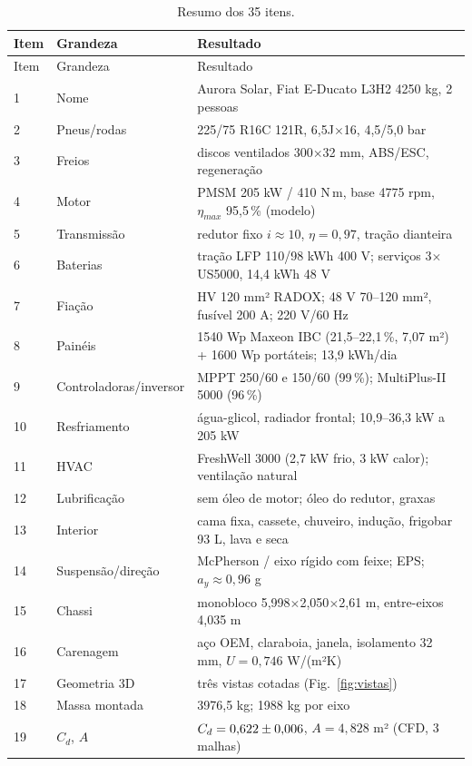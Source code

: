 \documentclass[11pt,a4paper]{article}
\begin{document}
\begin{longtable}{>{\raggedright}p{0.6cm}>{\raggedright}p{4.3cm}p{10.4cm}}
\caption{Resumo dos 35 itens.}\label{tab:resumo}\\
\toprule
Item & Grandeza & Resultado \\
\midrule\endfirsthead
\toprule Item & Grandeza & Resultado \\ \midrule\endhead
1 & Nome & Aurora Solar, Fiat E-Ducato L3H2 4250 kg, 2 pessoas \\
2 & Pneus/rodas & 225/75 R16C 121R, 6,5J$\times$16, 4,5/5,0 bar \\
3 & Freios & discos ventilados 300$\times$32 mm, ABS/ESC, regeneração \\
4 & Motor & PMSM 205 kW / 410 N\,m, base 4775 rpm, $\eta_{max}$ 95,5\,\% (modelo) \\
5 & Transmissão & redutor fixo $i\approx10$, $\eta = 0{,}97$, tração dianteira \\
6 & Baterias & tração LFP 110/98 kWh 400 V; serviços 3$\times$US5000, 14,4 kWh 48 V \\
7 & Fiação & HV 120 mm² RADOX; 48 V 70--120 mm², fusível 200 A; 220 V/60 Hz \\
8 & Painéis & 1540 Wp Maxeon IBC (21,5--22,1\,\%, 7,07 m²) + 1600 Wp portáteis; 13,9 kWh/dia \\
9 & Controladoras/inversor & MPPT 250/60 e 150/60 (99\,\%); MultiPlus-II 5000 (96\,\%) \\
10 & Resfriamento & água-glicol, radiador frontal; 10,9--36,3 kW a 205 kW \\
11 & HVAC & FreshWell 3000 (2,7 kW frio, 3 kW calor); ventilação natural \\
12 & Lubrificação & sem óleo de motor; óleo do redutor, graxas \\
13 & Interior & cama fixa, cassete, chuveiro, indução, frigobar 93 L, lava e seca \\
14 & Suspensão/direção & McPherson / eixo rígido com feixe; EPS; $a_y \approx 0{,}96$ g \\
15 & Chassi & monobloco 5,998$\times$2,050$\times$2,61 m, entre-eixos 4,035 m \\
16 & Carenagem & aço OEM, claraboia, janela, isolamento 32 mm, $U = 0{,}746$ W/(m²K) \\
17 & Geometria 3D & três vistas cotadas (Fig.~\ref{fig:vistas}) \\
18 & Massa montada & 3976,5 kg; 1988 kg por eixo \\
19 & $C_d$, $A$ & $C_d = 0{,}622 \pm 0{,}006$, $A = 4{,}828$ m² (CFD, 3 malhas) \\

\end{longtable}
\end{document}
